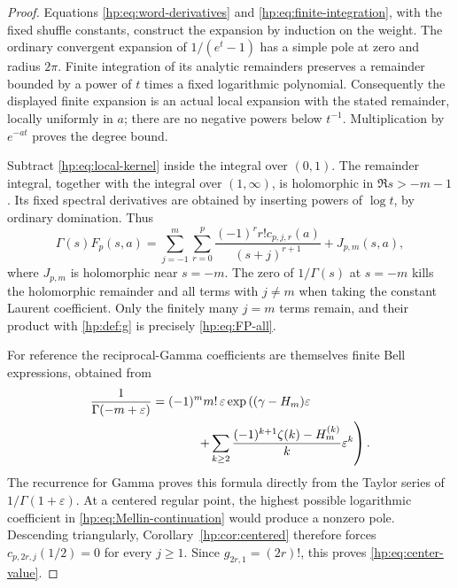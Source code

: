 \begin{proof}
Equations \eqref{hp:eq:word-derivatives} and
\eqref{hp:eq:finite-integration}, with the fixed shuffle constants,
construct the expansion by induction on the weight. The ordinary
convergent expansion of $1/(e^t-1)$ has a simple pole at zero and
radius $2\pi$. Finite integration of its analytic remainders preserves
a remainder bounded by a power of $t$ times a fixed logarithmic
polynomial. Consequently the displayed finite expansion is an actual
local expansion with the stated remainder, locally uniformly in $a$;
there are no negative powers below $t^{-1}$. Multiplication by
$e^{-at}$ proves the degree bound.

Subtract \eqref{hp:eq:local-kernel} inside the integral over $(0,1)$.
The remainder integral, together with the integral over $(1,\infty)$,
is holomorphic in $\Re s>-m-1$. Its fixed spectral derivatives are
obtained by inserting powers of $\log t$, by ordinary domination.
Thus
\begin{equation}\label{hp:eq:Mellin-continuation}
 \Gamma(s)F_p(s,a)=
 \sum_{j=-1}^{m}\sum_{r=0}^p
       \frac{(-1)^rr!c_{p,j,r}(a)}{(s+j)^{r+1}}+J_{p,m}(s,a),
\end{equation}
where $J_{p,m}$ is holomorphic near $s=-m$.
The zero of $1/\Gamma(s)$ at $s=-m$ kills the holomorphic remainder
and all terms with $j\ne m$ when taking the constant Laurent
coefficient. Only the finitely many $j=m$ terms remain, and their
product with \eqref{hp:def:g} is precisely \eqref{hp:eq:FP-all}.

For reference the reciprocal-Gamma coefficients are themselves finite
Bell expressions, obtained from
\begin{align}\label{hp:eq:gamma-generator}
 \frac1{\Gamma(-m+\varepsilon)}
 ={}&(-1)^m m!\,\varepsilon
 \exp\left((\gamma-H_m)\varepsilon\right.\notag\\
 &\left.\hspace{8mm}+
 \sum_{k\ge2}\frac{(-1)^{k+1}\zeta(k)-H_m^{(k)}}k
                                      \varepsilon^k\right).
\end{align}
The recurrence for Gamma proves this formula directly from the Taylor
series of $1/\Gamma(1+\varepsilon)$.
At a centered regular point, the highest possible logarithmic
coefficient in \eqref{hp:eq:Mellin-continuation} would produce a
nonzero pole. Descending triangularly, Corollary~\ref{hp:cor:centered}
therefore forces $c_{p,2r,j}(1/2)=0$ for every $j\ge1$. Since
$g_{2r,1}=(2r)!$, this proves \eqref{hp:eq:center-value}.
\end{proof}

